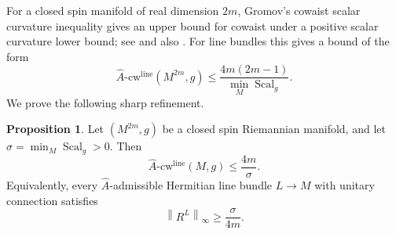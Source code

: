 \documentclass[11pt,reqno]{amsart}
\numberwithin{equation}{section}
\numberwithin{equation}{section}
\theoremstyle{definition}
\newtheorem{proposition}[theorem]{Proposition}
\DeclareMathOperator{\Scal}{Scal}
\newcommand{\Ah}{\widehat A}
\newcommand{\Ahcwline}{\widehat A\text{-}\mathrm{cw}^{\mathrm{line}}}
\newcommand{\norm}[1]{\left\lVert #1\right\rVert}
\begin{document}
For a closed spin manifold of real dimension \(2m\), Gromov's cowaist scalar curvature inequality gives an upper bound for cowaist under a positive scalar curvature lower bound; see \cite[Theorem 5 1/4]{Gromov} and also \cite[Theorem 3.4]{Stryker}. For line bundles this gives a bound of the form
\[
\Ahcwline(M^{2m},g)
\le
\frac{4m(2m-1)}{\min_M\Scal_g}.
\]
We prove the following sharp refinement.
\begin{proposition}\label{prop:refined-cowaist}
Let \((M^{2m},g)\) be a closed spin Riemannian manifold, and let \(\sigma=\min_M\Scal_g>0\). Then
\[
\Ahcwline(M,g)
\le
\frac{4m}{\sigma}.
\]
Equivalently, every \(\Ah\)-admissible Hermitian line bundle \(L\to M\) with unitary connection satisfies
\begin{equation}\label{eq:waistequiv}
\norm{R^L}_\infty \ge \frac{\sigma}{4m}.
\end{equation}
\end{proposition}
\end{document}
